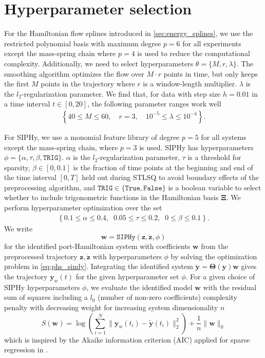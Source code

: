 \documentclass[11pt, a4paper]{article}
\theoremstyle{plain}
\theoremstyle{definition}
\theoremstyle{remark}
\begin{document}
\appendix

\section{Hyperparameter selection}\label{sec:hyper_selection}

For the Hamiltonian flow splines introduced in \cref{sec:energy_splines}, we use the restricted polynomial basis with maximum degree $p=6$ for all experiments except the mass-spring chain where $p=4$ is used to reduce the computational complexity. Additionally, we need to select hyperparameters $\theta =\{M, r, \lambda\}$. The smoothing algorithm optimizes the flow over $M\cdot r$ points in time, but only keeps the first $M$ points in the trajectory where $r$ is a window-length multiplier. $\lambda$ is the $l_2$-regularization parameter. We find that, for data with step size $h=0.01$ in a time interval $t\in [0,20]$, the following parameter ranges work well
\begin{align*}
   \left\{ 40 \leq M \leq 60,\quad r=3,  \quad  10^{-5} \leq\lambda \leq 10^{-4} \right\}.
\end{align*}

For SIPHy, we use a monomial feature library of degree $p = 5$ for all systems except the mass-spring chain, where $p = 3$ is used. SIPHy has hyperparameters $\phi = \{\alpha,\tau,\beta,\texttt{TRIG}\}$. $\alpha$ is the $l_2$-regularization parameter, \(\tau\) is a threshold for sparsity, \(\beta \in [0,0.1]\) is the fraction of time points at the beginning and end of the time interval $[0,T]$ held out during STLSQ to avoid boundary effects of the preprocessing algorithm, and $\texttt{TRIG} \in \{\texttt{True}, \texttt{False} \}$ is a boolean variable to select whether to include trigonometric functions in the Hamiltonian basis $\boldsymbol{\Xi}$. We perform hyperparameter optimization over the set
\begin{align*}
 \left\{ 0.1 \leq \alpha \leq 0.4, \;\; 0.05 \leq \tau \leq 0.2, \;\; 0 \leq  \beta \leq 0.1   \right \}.
\end{align*}
We write
\[
\mathbf{w} = \texttt{SIPHy}(\mathbf{z},\dot{\mathbf{z}},\phi)
\]
for the identified port-Hamiltonian system with coefficients \(\mathbf{w}\) from the preprocessed trajectory \(\mathbf{z},\dot{\mathbf{z}}\) with hyperparameters \(\phi\) by solving the optimization problem in \eqref{eq:phs_sindy}. Integrating the identified system $\dot{\mathbf{y}} = \boldsymbol{\Theta}(\mathbf{y}) \mathbf{w}$ gives the trajectory  \(\mathbf{y}_w(t)\) for the given hyperparameter set \(\phi\). For a given choice of SIPHy hyperparameters $\phi$, we evaluate the identified model $\mathbf{w}$ with the residual sum of squares including a $l_0$ (number of non-zero coefficients) complexity penalty with decreasing weight for increasing system dimensionality $n$
\[
S(\mathbf{w}) = \log \left ( \sum_{i=1}^{N} \big\| \mathbf{y}_w(t_i) - \tilde{\mathbf{y}}(t_i) \big\|_2^2 \right ) + \frac{1}{n}\|\mathbf{w}\|_0 
\]
which is inspired by the Akaike information criterion (AIC) applied for sparse regression in \cite{mangan2017model}.
\end{document}
